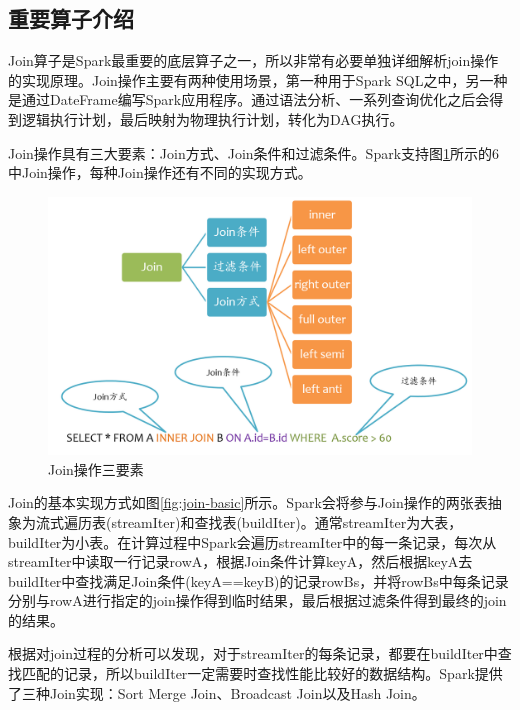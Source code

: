 \subsection{重要算子介绍}

Join算子是Spark最重要的底层算子之一，所以非常有必要单独详细解析join操作的实现原理。Join操作主要有两种使用场景，第一种用于Spark SQL之中，另一种是通过DateFrame编写Spark应用程序。通过语法分析、一系列查询优化之后会得到逻辑执行计划，最后映射为物理执行计划，转化为DAG执行。

Join操作具有三大要素：Join方式、Join条件和过滤条件。Spark支持图\ref{fig:join-overview}所示的6中Join操作，每种Join操作还有不同的实现方式。


\begin{figure}[htbp]
    \centering
    \includegraphics[width=1\textwidth]{Img/spark-sql-join-overview.png}
    \caption{Join操作三要素}
    \label{fig:join-overview}
\end{figure}

Join的基本实现方式如图\ref{fig:join-basic}所示。Spark会将参与Join操作的两张表抽象为流式遍历表(streamIter)和查找表(buildIter)。通常streamIter为大表，buildIter为小表。在计算过程中Spark会遍历streamIter中的每一条记录，每次从streamIter中读取一行记录rowA，根据Join条件计算keyA，然后根据keyA去buildIter中查找满足Join条件(keyA==keyB)的记录rowBs，并将rowBs中每条记录分别与rowA进行指定的join操作得到临时结果，最后根据过滤条件得到最终的join的结果。

根据对join过程的分析可以发现，对于streamIter的每条记录，都要在buildIter中查找匹配的记录，所以buildIter一定需要时查找性能比较好的数据结构。Spark提供了三种Join实现：Sort Merge Join、Broadcast Join以及Hash Join。

